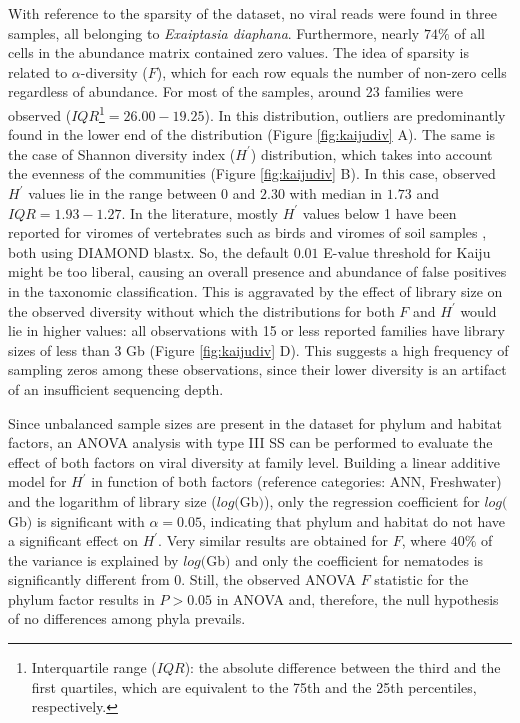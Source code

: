 \documentclass[
  openany]{book}
\begin{document}
With reference to the sparsity of the dataset, no viral reads were found in three samples, all belonging to \emph{Exaiptasia diaphana}. Furthermore, nearly \(74\%\) of all cells in the abundance matrix contained zero values. The idea of sparsity is related to \(\alpha\)-diversity (\(F\)), which for each row equals the number of non-zero cells regardless of abundance. For most of the samples, around 23 families were observed (\(IQR\)\footnote{Interquartile range (\(IQR\)): the absolute difference between the third and the first quartiles, which are equivalent to the 75th and the 25th percentiles, respectively.}\(= 26.00 - 19.25\)). In this distribution, outliers are predominantly found in the lower end of the distribution (Figure \ref{fig:kaijudiv} A). The same is the case of Shannon diversity index (\(H^\prime\)) distribution, which takes into account the evenness of the communities (Figure \ref{fig:kaijudiv} B). In this case, observed \(H^\prime\) values lie in the range between 0 and \(2.30\) with median in \(1.73\) and \(IQR = 1.93-1.27\). In the literature, mostly \(H^\prime\) values below 1 have been reported for viromes of vertebrates such as birds \autocite{Geoghegan2021} and viromes of soil samples \autocite{Adriaenssens2017}, both using DIAMOND blastx. So, the default \(0.01\) E-value threshold for Kaiju might be too liberal, causing an overall presence and abundance of false positives in the taxonomic classification. This is aggravated by the effect of library size on the observed diversity without which the distributions for both \(F\) and \(H^\prime\) would lie in higher values: all observations with 15 or less reported families have library sizes of less than 3 Gb (Figure \ref{fig:kaijudiv} D). This suggests a high frequency of sampling zeros among these observations, since their lower diversity is an artifact of an insufficient sequencing depth.

Since unbalanced sample sizes are present in the dataset for phylum and habitat factors, an ANOVA analysis with type III SS can be performed to evaluate the effect of both factors on viral diversity at family level. Building a linear additive model for \(H^\prime\) in function of both factors (reference categories: ANN, Freshwater) and the logarithm of library size (\(log(\)Gb\()\)), only the regression coefficient for \(log(\)Gb\()\) is significant with \(\alpha = 0.05\), indicating that phylum and habitat do not have a significant effect on \(H^\prime\). Very similar results are obtained for \(F\), where \(40\%\) of the variance is explained by \(log(\)Gb\()\) and only the coefficient for nematodes is significantly different from 0. Still, the observed ANOVA \(F\) statistic for the phylum factor results in \(P > 0.05\) in ANOVA and, therefore, the null hypothesis of no differences among phyla prevails.
\end{document}

